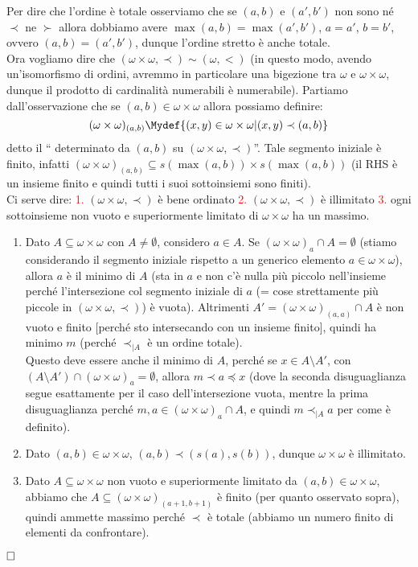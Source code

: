 \documentclass[11pt]{scrartcl}
\begin{document}
	Per dire che l'ordine è totale osserviamo che se $(a,b)$ e $(a',b')$ non sono né $\prec$ ne $\succ$ allora dobbiamo avere $\max(a,b) = \max(a',b')$, $a = a'$, $b = b'$, ovvero $(a,b) = (a',b')$, dunque l'ordine stretto è anche totale.\\
	Ora vogliamo dire che $(\omega \times \omega, \prec) \sim (\omega, <)$ (in questo modo, avendo un'isomorfismo di ordini, avremmo in particolare una bigezione tra $\omega$ e $\omega \times \omega$, dunque il prodotto di cardinalità numerabili è numerabile).
	Partiamo dall'osservazione che se $(a,b) \in \omega \times \omega$ allora possiamo definire:
	\[ (\omega \times \omega)_{(a,b)} \Mydef \{(x,y) \in \omega \times \omega | (x,y) \prec (a,b)\}
		\]
	detto il `` determinato da $(a,b)$ su $(\omega \times \omega,\prec)$''. Tale segmento iniziale è finito, infatti $(\omega \times \omega)_{(a,b)} \subseteq s(\max(a,b)) \times s(\max(a,b))$ (il RHS è un insieme finito e quindi tutti i suoi sottoinsiemi 
	sono finiti).\\
	Ci serve dire: \textcolor{red}{1.} $(\omega \times \omega, \prec)$ è bene ordinato \textcolor{red}{2.} $(\omega \times \omega, \prec)$ è illimitato \textcolor{red}{3.} ogni sottoinsieme non vuoto e superiormente limitato di $\omega \times \omega$ ha un massimo.
	\begin{enumerate}[1.]
		\item Dato $A \subseteq \omega \times \omega$ con $A \ne \emptyset$, considero $a \in A$. Se $(\omega \times \omega)_a \cap A = \emptyset$ (stiamo considerando il segmento iniziale rispetto a un generico elemento $a\in\omega \times \omega$), allora $a$ è il minimo di $A$ (sta in $a$ e
		non c'è nulla più piccolo nell'insieme perché l'intersezione col segmento iniziale di $a$ (= cose strettamente più piccole in $(\omega \times \omega,\prec)$) è vuota). Altrimenti $A' = (\omega \times \omega)_{(a,a)} \cap A$ è non vuoto e finito [perché sto intersecando con un insieme finito],
		quindi ha minimo $m$ (perché $\prec_{|A}$ è un ordine totale).\\ Questo deve essere anche il minimo di $A$, perché se $x \in A \setminus A'$, con $(A \setminus A') \cap (\omega \times \omega)_a = \emptyset$, allora $m \prec a \preceq x$ (dove la seconda disuguaglianza segue esattamente per il caso dell'intersezione vuota,
		mentre la prima disuguaglianza perché $m, a \in (\omega \times \omega)_a \cap A$, e quindi $m \prec_{|A} a$ per come è definito).
		\item Dato $(a,b) \in \omega \times \omega$, $(a,b) \prec (s(a),s(b))$, dunque $\omega \times \omega$ è illimitato.
		\item Dato $A \subseteq \omega \times \omega$ non vuoto e superiormente limitato da $(a,b) \in \omega \times \omega$, abbiamo che $A \subseteq (\omega \times \omega)_{(a+1,b+1)}$ è finito (per quanto osservato sopra), quindi ammette massimo perché $\prec$ è totale (abbiamo un numero finito di elementi da confrontare).
	\end{enumerate}
$\hfill\square$
\end{document}
